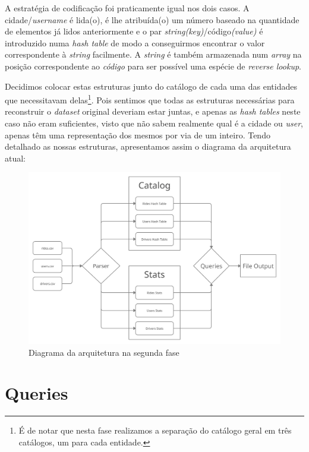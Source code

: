 \documentclass[12pt,a4paper]{report}
\begin{document}
    \par A estratégia de codificação foi praticamente igual nos dois casos. A cidade/\textit{username} é lida(o), é lhe atribuída(o) um número baseado na quantidade de elementos já lidos anteriormente e o par \textit{string}\textit{(key)}/código\textit{(value)} é introduzido numa \textit{hash table} de modo a conseguirmos encontrar o valor correspondente à \textit{string} facilmente. A \textit{string} é também armazenada num \textit{array} na posição correspondente ao \textit{código} para ser possível uma espécie de \textit{reverse lookup}.
    \par Decidimos colocar estas estruturas junto do catálogo de cada uma das entidades que necessitavam delas\footnote{É de notar que nesta fase realizamos a separação do catálogo geral em três catálogos, um para cada entidade.}. Pois sentimos que todas as estruturas necessárias para reconstruir o \textit{dataset} original deveriam estar juntas, e apenas as \textit{hash tables} neste caso não eram suficientes, visto que não sabem realmente qual é a cidade ou \textit{user}, apenas têm uma representação dos mesmos por via de um inteiro.
\newpage
    \noindent Tendo detalhado as nossas estruturas, apresentamos assim o diagrama da arquitetura atual:\\
    
    \begin{figure}[h]
    \includegraphics[scale = 0.155]{diagram1.png}
    \centering
    \caption{Diagrama da arquitetura na segunda fase}
    \end{figure} 
    
\newpage

    \chapter{Queries}
    
\end{document}
